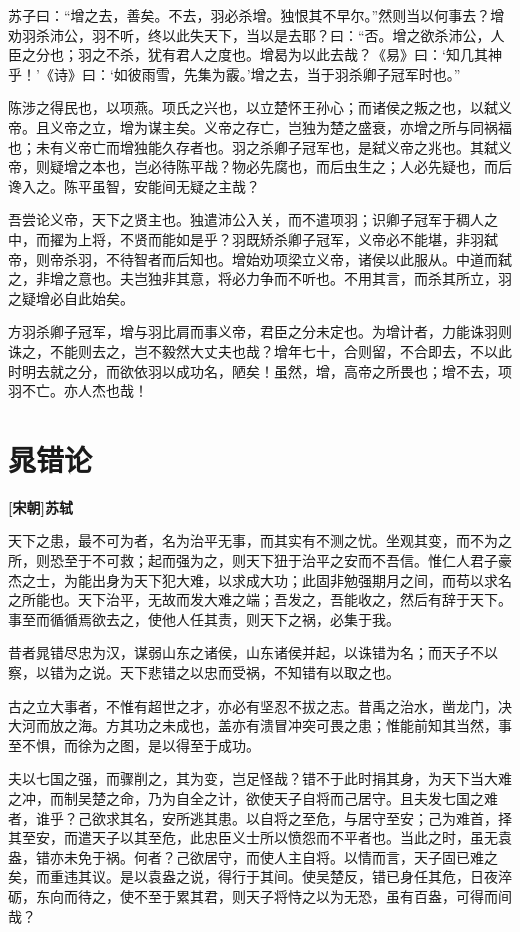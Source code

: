 \documentclass[UTF8,titlepage,oneside]{ctexbook}
\begin{document}
苏子曰：“增之去，善矣。不去，羽必杀增。独恨其不早尔。”然则当以何事去？增劝羽杀沛公，羽不听，终以此失天下，当以是去耶？曰：“否。增之欲杀沛公，人臣之分也；羽之不杀，犹有君人之度也。增曷为以此去哉？《易》曰：‘知几其神乎！’《诗》曰：‘如彼雨雪，先集为霰。’增之去，当于羽杀卿子冠军时也。”


陈涉之得民也，以项燕。项氏之兴也，以立楚怀王孙心；而诸侯之叛之也，以弑义帝。且义帝之立，增为谋主矣。义帝之存亡，岂独为楚之盛衰，亦增之所与同祸福也；未有义帝亡而增独能久存者也。羽之杀卿子冠军也，是弑义帝之兆也。其弑义帝，则疑增之本也，岂必待陈平哉？物必先腐也，而后虫生之；人必先疑也，而后谗入之。陈平虽智，安能间无疑之主哉？


吾尝论义帝，天下之贤主也。独遣沛公入关，而不遣项羽；识卿子冠军于稠人之中，而擢为上将，不贤而能如是乎？羽既矫杀卿子冠军，义帝必不能堪，非羽弑帝，则帝杀羽，不待智者而后知也。增始劝项梁立义帝，诸侯以此服从。中道而弑之，非增之意也。夫岂独非其意，将必力争而不听也。不用其言，而杀其所立，羽之疑增必自此始矣。


方羽杀卿子冠军，增与羽比肩而事义帝，君臣之分未定也。为增计者，力能诛羽则诛之，不能则去之，岂不毅然大丈夫也哉？增年七十，合则留，不合即去，不以此时明去就之分，而欲依羽以成功名，陋矣！虽然，增，高帝之所畏也；增不去，项羽不亡。亦人杰也哉！



\chapter*{晁错论}
\begin{center}
	\textbf{[宋朝]苏轼}
\end{center}

天下之患，最不可为者，名为治平无事，而其实有不测之忧。坐观其变，而不为之所，则恐至于不可救；起而强为之，则天下狃于治平之安而不吾信。惟仁人君子豪杰之士，为能出身为天下犯大难，以求成大功；此固非勉强期月之间，而苟以求名之所能也。天下治平，无故而发大难之端；吾发之，吾能收之，然后有辞于天下。事至而循循焉欲去之，使他人任其责，则天下之祸，必集于我。


昔者晁错尽忠为汉，谋弱山东之诸侯，山东诸侯并起，以诛错为名；而天子不以察，以错为之说。天下悲错之以忠而受祸，不知错有以取之也。


古之立大事者，不惟有超世之才，亦必有坚忍不拔之志。昔禹之治水，凿龙门，决大河而放之海。方其功之未成也，盖亦有溃冒冲突可畏之患；惟能前知其当然，事至不惧，而徐为之图，是以得至于成功。


夫以七国之强，而骤削之，其为变，岂足怪哉？错不于此时捐其身，为天下当大难之冲，而制吴楚之命，乃为自全之计，欲使天子自将而己居守。且夫发七国之难者，谁乎？己欲求其名，安所逃其患。以自将之至危，与居守至安；己为难首，择其至安，而遣天子以其至危，此忠臣义士所以愤怨而不平者也。当此之时，虽无袁盎，错亦未免于祸。何者？己欲居守，而使人主自将。以情而言，天子固已难之矣，而重违其议。是以袁盎之说，得行于其间。使吴楚反，错已身任其危，日夜淬砺，东向而待之，使不至于累其君，则天子将恃之以为无恐，虽有百盎，可得而间哉？
\end{document}

